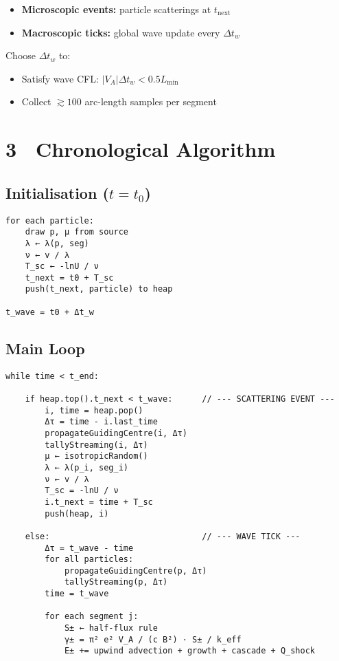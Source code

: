 {\begin{itemize}
\item \textbf{Microscopic events:} particle scatterings at $t_{\text{next}}$
\item \textbf{Macroscopic ticks:} global wave update every $\Delta t_w$
\end{itemize}

Choose $\Delta t_w$ to:
\begin{itemize}
\item Satisfy wave CFL: $|V_A|\Delta t_w < 0.5 L_{\min}$
\item Collect $\gtrsim 100$ arc-length samples per segment
\end{itemize}

\section*{3 Chronological Algorithm}

\subsection*{Initialisation ($t = t_0$)}

\begin{lstlisting}
for each particle:
    draw p, μ from source
    λ ← λ(p, seg)
    ν ← v / λ
    T_sc ← -lnU / ν
    t_next = t0 + T_sc
    push(t_next, particle) to heap

t_wave = t0 + Δt_w
\end{lstlisting}

\subsection*{Main Loop}

\begin{lstlisting}
while time < t_end:

    if heap.top().t_next < t_wave:      // --- SCATTERING EVENT ---
        i, time = heap.pop()
        Δτ = time - i.last_time
        propagateGuidingCentre(i, Δτ)
        tallyStreaming(i, Δτ)
        μ ← isotropicRandom()
        λ ← λ(p_i, seg_i)
        ν ← v / λ
        T_sc = -lnU / ν
        i.t_next = time + T_sc
        push(heap, i)

    else:                               // --- WAVE TICK ---
        Δτ = t_wave - time
        for all particles:
            propagateGuidingCentre(p, Δτ)
            tallyStreaming(p, Δτ)
        time = t_wave

        for each segment j:
            S± ← half-flux rule
            γ± = π² e² V_A / (c B²) · S± / k_eff
            E± += upwind advection + growth + cascade + Q_shock


\end{lstlisting}}

